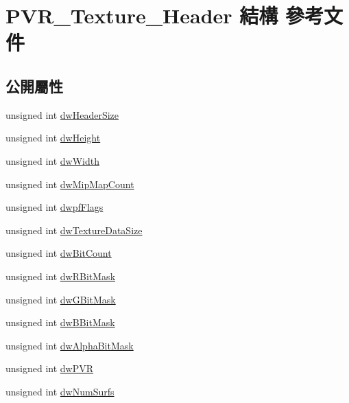 \hypertarget{struct_p_v_r___texture___header}{}\section{P\+V\+R\+\_\+\+Texture\+\_\+\+Header 結構 參考文件}
\label{struct_p_v_r___texture___header}
\subsection*{公開屬性}
\begin{DoxyCompactItemize}
\item 
unsigned int \hyperlink{struct_p_v_r___texture___header_a1b70d66c96e4291a170028d0ba6bac0e}{dw\+Header\+Size}
\item 
unsigned int \hyperlink{struct_p_v_r___texture___header_a5c9d7a15be622005fae8247ea1d593df}{dw\+Height}
\item 
unsigned int \hyperlink{struct_p_v_r___texture___header_a35506d49c7fb8fe89cf2d35ec1727bdd}{dw\+Width}
\item 
unsigned int \hyperlink{struct_p_v_r___texture___header_a40241f20ad91369c72a9f7285b8c4ff5}{dw\+Mip\+Map\+Count}
\item 
unsigned int \hyperlink{struct_p_v_r___texture___header_ab89dc74cf18383d2d41397e2e839faeb}{dwpf\+Flags}
\item 
unsigned int \hyperlink{struct_p_v_r___texture___header_ad2a7eea61233461d085191891734177f}{dw\+Texture\+Data\+Size}
\item 
unsigned int \hyperlink{struct_p_v_r___texture___header_adc064257d63a00e00e131c7d93728067}{dw\+Bit\+Count}
\item 
unsigned int \hyperlink{struct_p_v_r___texture___header_a94f02eef9ff95c18c3922ce84b3e59da}{dw\+R\+Bit\+Mask}
\item 
unsigned int \hyperlink{struct_p_v_r___texture___header_a2acd87653ac81f7d304112b48e92bec8}{dw\+G\+Bit\+Mask}
\item 
unsigned int \hyperlink{struct_p_v_r___texture___header_a9f60e62a5fb60d092357965c265d723d}{dw\+B\+Bit\+Mask}
\item 
unsigned int \hyperlink{struct_p_v_r___texture___header_a63720b915d8a00edd8d918c91e533cd3}{dw\+Alpha\+Bit\+Mask}
\item 
unsigned int \hyperlink{struct_p_v_r___texture___header_a1aa3e8921cb7576374622129a952dd72}{dw\+P\+VR}
\item 
unsigned int \hyperlink{struct_p_v_r___texture___header_ab5a48ebff7ae60e21b335fb7f8d1c2e3}{dw\+Num\+Surfs}
\end{DoxyCompactItemize}


